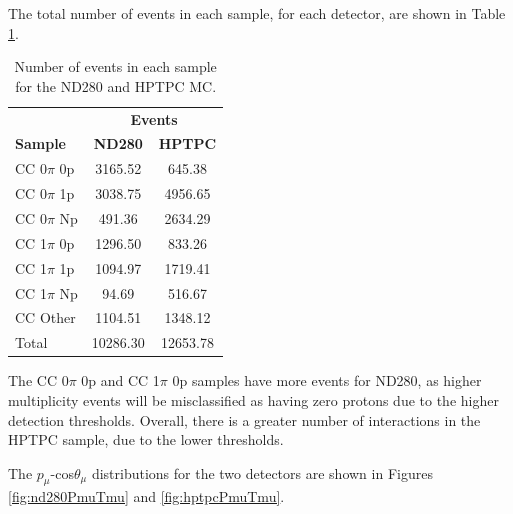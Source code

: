 The total number of events in each sample, for each detector, are shown in Table \ref{tab:hptpcrates}.

\begin{center}
\begin{table}[!htbp]
\center
\begin{tabular}{l ||c c}
\hline \hline
& \multicolumn{2}{c}{\textbf{Events}}\\
\textbf{Sample} & \textbf{ND280} & \textbf{HPTPC} \\
 \hline \hline
CC 0$\pi$ 0p & 3165.52 & 645.38 \\
CC 0$\pi$ 1p & 3038.75 & 4956.65 \\
CC 0$\pi$ Np & 491.36 & 2634.29 \\
CC 1$\pi$ 0p & 1296.50 & 833.26 \\
CC 1$\pi$ 1p & 1094.97 & 1719.41\\
CC 1$\pi$ Np & 94.69 & 516.67 \\
CC Other & 1104.51 & 1348.12 \\
\hline
Total & 10286.30 & 12653.78 \\
\hline \hline
\end{tabular}
\caption{Number of events in each sample for the ND280 and HPTPC MC.}
\label{tab:hptpcrates}
\end{table}
\end{center}

The CC 0$\pi$ 0p and CC 1$\pi$ 0p samples have more events for ND280, as higher multiplicity events will be misclassified as having zero protons due to the higher detection thresholds. Overall, there is a greater number of interactions in the HPTPC sample, due to the lower thresholds.

The $p_{\mu}$-cos$\theta_{\mu}$ distributions for the two detectors are shown in Figures \ref{fig:nd280PmuTmu} and \ref{fig:hptpcPmuTmu}.

